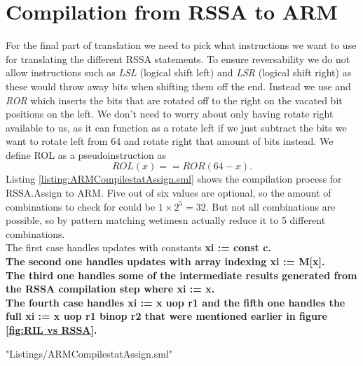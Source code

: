\section{Compilation from RSSA to ARM}
For the final part of translation we need to pick what instructions we want to use for translating the different RSSA statements.
To ensure reversability we do not allow instructions such as \emph{LSL} (logical shift left) and \emph{LSR} (logical shift right) as these would throw away bits when shifting them off the end. Instead we use and \emph{ROR} which inserts the bits that are rotated off to the right on the vacated bit positions on the left. We don't need to worry about only having rotate right available to us, as it can function as a rotate left if we just subtract the bits we want to rotate left from 64 and rotate right that amount of bits instead. We define ROL as a pseudoinstruction as
\begin{equation*}
  ROL(x) == ROR(64-x).
\end{equation*}
Listing \ref{listing:ARMCompilestatAssign.sml} shows the compilation process for RSSA.Assign to ARM. Five out of six values are optional, so the amount of combinations to check for could be $1 \times 2^5 = 32$. But not all combinations are possible, so by pattern matching wetimesn actually reduce it to 5 different combinations.\\
The first case handles updates with constants \bf{xi := const c}. \\
The second one handles updates with array indexing \bf{xi := M[x]}.\\
The third one handles some of the intermediate results generated from the RSSA compilation step where \bf{xi := x}.\\
The fourth case handles \bf{xi := x uop r1} and the fifth one handles the full \bf{xi := x uop r1 binop r2} that were mentioned earlier in figure \ref{fig:RIL vs RSSA}.

 {"Listings/ARMCompilestatAssign.sml"}

